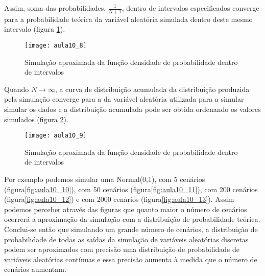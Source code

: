  Assim, soma das probabilidades, $\frac{1}{N+1}$, dentro de intervalos especificados converge para a probabilidade teórica da variável aleatória simulada dentro deste mesmo intervalo (figura \ref{fig:aula10_8}).

\begin{figure}[H]
\begin{centering}
\texttt{[image: aula10\_8]}\protect\caption{\label{fig:aula10_8} Simulação aproximada da função densidade de probabilidade dentro de intervalos}
\end{centering}
\end{figure}

 Quando $N\rightarrow\infty$, a curva de distribuição acumulada da distribuição produzida pela simulação converge para a da variável aleatória utilizada para a simular simular os dados e a distribuição acumulada pode ser obtida ordenando os valores simulados (figura \ref{fig:aula10_9}).

\begin{figure}[H]
\begin{centering}
\texttt{[image: aula10\_9]}\protect\caption{\label{fig:aula10_9} Simulação aproximada da função densidade de probabilidade dentro de intervalos}
\end{centering}
\end{figure}

Por exemplo podemos simular uma Normal(0,1), com 5 cenários (figura\ref{fig:aula10_10}), com 50 cenários (figura\ref{fig:aula10_11}), com 200 cenários (figura\ref{fig:aula10_12}) e com 2000 cenários (figura\ref{fig:aula10_13}). Assim podemos perceber através das figuras que quanto maior o número de cenários ocorrerá a aproximação da simulação com a distribuição de probabilidade teórica.
Conclui-se então que simulando um grande número de cenários, a distribuição de
probabilidade de todas as saídas da simulação de variáveis aleatórias discretas podem ser aproximados com precisão uma distribuição de probabilidade de variáveis aleatórias contínuas e essa precisão aumenta à medida que o número de cenários aumentam.

